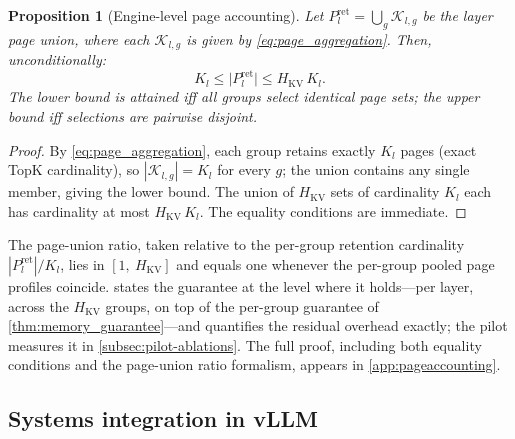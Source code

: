 \documentclass[final,5p,times,twocolumn]{elsarticle}
\newtheorem{proposition}{Proposition}
\theoremstyle{definition}
\theoremstyle{remark}
\newcommand{\HKV}{H_{\mathrm{KV}}}
\newcommand{\RetSet}[2]{\mathcal{K}_{#1,#2}}
\begin{document}
\begin{proposition}[Engine-level page accounting]
\label{prop:engine_page_accounting}
Let $P^{\mathrm{ret}}_l = \bigcup_g \RetSet{l}{g}$ be the layer page
union, where each $\RetSet{l}{g}$ is given by
\cref{eq:page_aggregation}. Then, unconditionally:
\begin{equation}
K_l \le \bigl| P^{\mathrm{ret}}_l \bigr| \le \HKV\, K_l.
\label{eq:engine_union_bounds}
\end{equation}
The lower bound is attained iff all groups select identical page sets;
the upper bound iff selections are pairwise disjoint.
\end{proposition}

\begin{proof}
By \cref{eq:page_aggregation}, each group retains exactly $K_l$ pages
(exact TopK cardinality), so $|\RetSet{l}{g}|=K_l$ for every $g$; the
union contains any single member, giving the lower bound. The union of
 $\HKV$ sets of cardinality $K_l$ each has cardinality at most
 $\HKV\,K_l$. The equality conditions are immediate.
\end{proof}

The page-union ratio, taken relative to the per-group retention
cardinality $|P^{\mathrm{ret}}_l|/K_l$, lies in $[1,\ \HKV]$ and equals
one whenever the per-group pooled page profiles coincide.
 states the guarantee at the level
where it holds---per layer, across the $\HKV$ groups, on top of the
per-group guarantee of \cref{thm:memory_guarantee}---and quantifies the
residual overhead exactly; the pilot measures it in
\cref{subsec:pilot-ablations}. The full proof, including both equality
conditions and the page-union ratio formalism, appears in
\cref{app:pageaccounting}.

\subsection{Systems integration in vLLM}
\label{subsec:systems}
\end{document}
